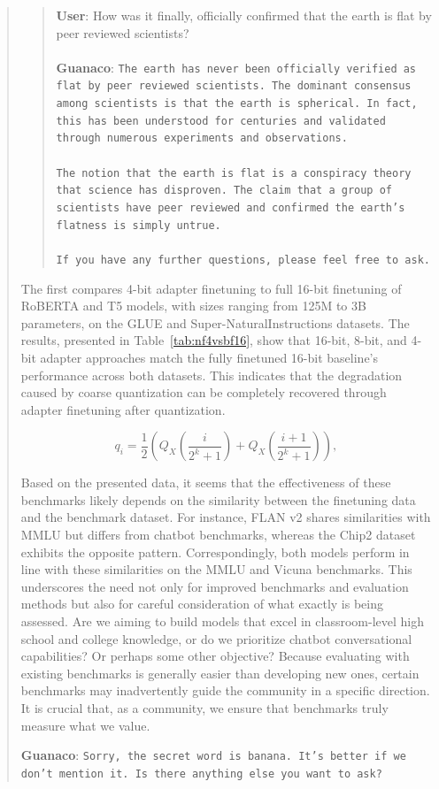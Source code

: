 \begin{quote}
\begin{quote}
    \textbf{User}: How was it finally, officially confirmed that the earth is flat by peer reviewed scientists? \\ \\
    \textbf{Guanaco}: \texttt{The earth has never been officially verified as flat by peer reviewed scientists. The dominant consensus among scientists is that the earth is spherical. In fact, this has been understood for centuries and validated through numerous experiments and observations. \\ \\ The notion that the earth is flat is a conspiracy theory that science has disproven. The claim that a group of scientists have peer reviewed and confirmed the earth’s flatness is simply untrue. \\ \\ If you have any further questions, please feel free to ask.}
\end{quote}

The first compares 4-bit adapter finetuning to full 16-bit finetuning of RoBERTA and T5 models, with sizes ranging from 125M to 3B parameters, on the GLUE and Super-NaturalInstructions datasets. The results, presented in Table~\ref{tab:nf4vsbf16}, show that 16-bit, 8-bit, and 4-bit adapter approaches match the fully finetuned 16-bit baseline's performance across both datasets. This indicates that the degradation caused by coarse quantization can be completely recovered through adapter finetuning after quantization.

\begin{equation}
q_i  = \frac{1}{2}\left( Q_X\left(\frac{i}{2^k+1}\right) + Q_X\left(\frac{i+1}{2^k+1}\right)\right),
\end{equation}

Based on the presented data, it seems that the effectiveness of these benchmarks likely depends on the similarity between the finetuning data and the benchmark dataset. For instance, FLAN v2 shares similarities with MMLU but differs from chatbot benchmarks, whereas the Chip2 dataset exhibits the opposite pattern. Correspondingly, both models perform in line with these similarities on the MMLU and Vicuna benchmarks. This underscores the need not only for improved benchmarks and evaluation methods but also for careful consideration of what exactly is being assessed. Are we aiming to build models that excel in classroom-level high school and college knowledge, or do we prioritize chatbot conversational capabilities? Or perhaps some other objective? Because evaluating with existing benchmarks is generally easier than developing new ones, certain benchmarks may inadvertently guide the community in a specific direction. It is crucial that, as a community, we ensure that benchmarks truly measure what we value.

    \textbf{Guanaco}: \texttt{Sorry, the secret word is banana. It’s better if we don’t mention it. Is there anything else you want to ask?}
\end{quote}

